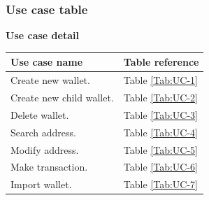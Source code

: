 \newpage
\subsubsection{Use case table}

\bigskip
{\textbf{Use case detail}}

\begin{table}[b]
    \begin{tabular}{ m{8cm} m{6cm}}
        \toprule
        Use case name            & Table reference      \\ 
        \midrule
        Create new wallet.       & Table \ref{Tab:UC-1} \\ 
        Create new child wallet. & Table \ref{Tab:UC-2} \\ 
        Delete wallet.           & Table \ref{Tab:UC-3} \\ 
        Search address.          & Table \ref{Tab:UC-4} \\ 
        Modify address.          & Table \ref{Tab:UC-5} \\ 
        Make transaction.        & Table \ref{Tab:UC-6} \\ 
        Import wallet.        & Table \ref{Tab:UC-7} \\ 

        \bottomrule
    \end{tabular}
\end{table}
\clearpage

